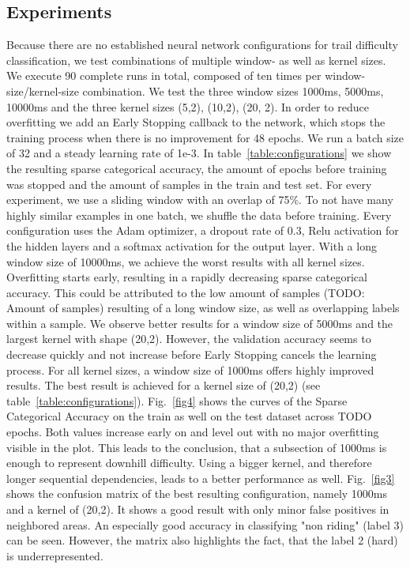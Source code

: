 \documentclass[runningheads]{llncs}
\begin{document}
\FloatBarrier
\subsection{Experiments}

Because there are no established neural network configurations for trail difficulty classification, we test combinations of multiple window- as well as kernel sizes.
We execute 90 complete runs in total, composed of ten times per window-size/kernel-size combination.
We test the three window sizes 1000ms, 5000ms, 10000ms and the three kernel sizes (5,2), (10,2), (20, 2).
In order to reduce overfitting we add an Early Stopping callback to the network, which stops the training process when there is no improvement for 48 epochs.
We run a batch size of 32 and a steady learning rate of 1e-3.
In table~\ref{table:configurations} we show the resulting sparse categorical accuracy, the amount of epochs before training was stopped and the amount of samples in the train and test set.
For every experiment, we use a sliding window with an overlap of 75\%.
To not have many highly similar examples in one batch, we shuffle the data before training.
Every configuration uses the Adam optimizer, a dropout rate of 0.3, Relu activation for the hidden layers and a softmax activation for the output layer.
With a long window size of 10000ms, we achieve the worst results with all kernel sizes.
Overfitting starts early, resulting in a rapidly decreasing sparse categorical accuracy.
This could be attributed to the low amount of samples (TODO: Amount of samples) resulting of a long window size, as well as overlapping labels within a sample.
We observe better results for a window size of 5000ms and the largest kernel with shape (20,2).
However, the validation accuracy seems to decrease quickly and not increase before Early Stopping cancels the learning process.
For all kernel sizes, a window size of 1000ms offers highly improved results.
The best result is achieved for a kernel size of (20,2) (see table~\ref{table:configurations}).
Fig.~\ref{fig4} shows the curves of the Sparse Categorical Accuracy on the train as well on the test dataset across TODO epochs. %
Both values increase early on and level out with no major overfitting visible in the plot.
This leads to the conclusion, that a subsection of 1000ms is enough to represent downhill difficulty.
Using a bigger kernel, and therefore longer sequential dependencies, leads to a better performance as well.
Fig.~\ref{fig3} shows the confusion matrix of the best resulting configuration, namely 1000ms and a kernel of (20,2).
It shows a good result with only minor false positives in neighbored areas. An especially good accuracy in classifying "non riding" (label 3) can be seen.
However, the matrix also highlights the fact, that the label 2 (hard) is underrepresented.
\end{document}
